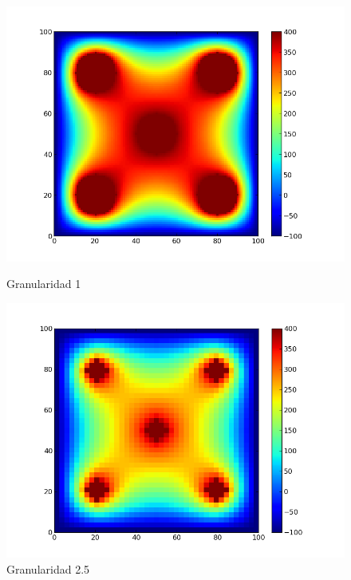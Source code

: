 \begin{figure}[htb]

\begin{center}
       \includegraphics[scale=0.3]{imagenes/test5_gran1.png}
                \caption{Granularidad 1}
        \end{center}
\endminipage\hfill
{}
\begin{center}
        \includegraphics[scale=0.3]{imagenes/test5.png}
                \caption{Granularidad 2.5}
        \end{center}
\endminipage\hfill 
\end{figure}


